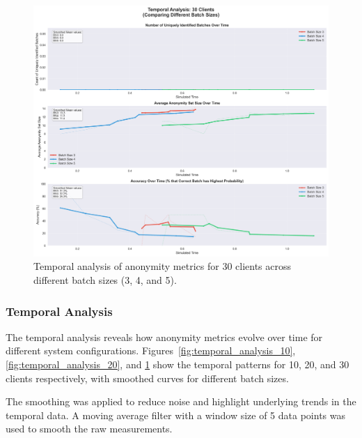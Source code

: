 \documentclass{article}
\begin{document}
\begin{figure}
\centering
\includegraphics[width=\textwidth]{diagrams/temporal_5_smoothed_30_clients.png}
\caption{Temporal analysis of anonymity metrics for 30 clients across different batch sizes (3, 4, and 5).}
\label{fig:temporal_analysis_30}
\end{figure}


\subsubsection{Temporal Analysis}

The temporal analysis reveals how anonymity metrics evolve 
over time for different system configurations. 
Figures~\ref{fig:temporal_analysis_10}, \ref{fig:temporal_analysis_20}, 
and \ref{fig:temporal_analysis_30} show the temporal patterns 
for 10, 20, and 30 clients respectively, with smoothed curves 
for different batch sizes. 

The smoothing was applied to reduce noise and highlight 
underlying trends in the temporal data. A moving average 
filter with a window size of 5 data points was used 
to smooth the raw measurements. 
\end{document}

